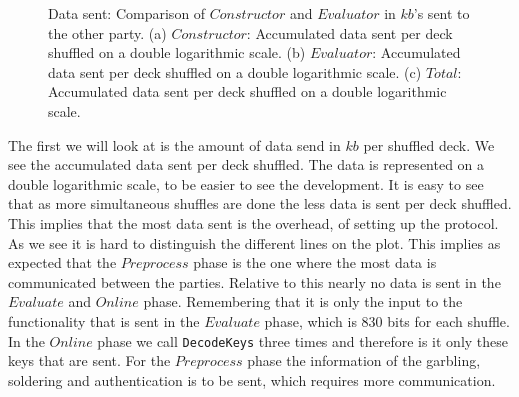 \documentclass[twoside,11pt,openright]{report}
\begin{document}
\begin{figure}
    \begin{subfigure}{\textwidth}
        \centering
        \caption{}
        \label{fig:total_kb_plot}
    \end{subfigure}

    \caption{Data sent: Comparison of $Constructor$ and $Evaluator$ in $kb$'s sent to the other party. (a) $Constructor$: Accumulated data sent per deck shuffled on a double logarithmic scale. (b) $Evaluator$: Accumulated data sent per deck shuffled on a double logarithmic scale. (c) $Total$: Accumulated data sent per deck shuffled on a double logarithmic scale.}
    \label{fig:mesurement_kb}
\end{figure}

The first we will look at is the amount of data send in $kb$ per shuffled deck. We see the accumulated data sent per deck shuffled. The data is represented on a double logarithmic scale, to be easier to see the development. It is easy to see that as more simultaneous shuffles are done the less data is sent per deck shuffled. This implies that the most data sent is the overhead, of setting up the protocol. As we see it is hard to distinguish the different lines on the plot. This implies as expected that the $Preprocess$ phase is the one where the most data is communicated between the parties. Relative to this nearly no data is sent in the $Evaluate$ and $Online$ phase. Remembering that it is only the input to the functionality that is sent in the $Evaluate$ phase, which is $830$ bits for each shuffle. In the $Online$ phase we call \verb|DecodeKeys| three times and therefore is it only these keys that are sent. For the $Preprocess$ phase the information of the garbling, soldering and authentication is to be sent, which requires more communication.
\end{document}
